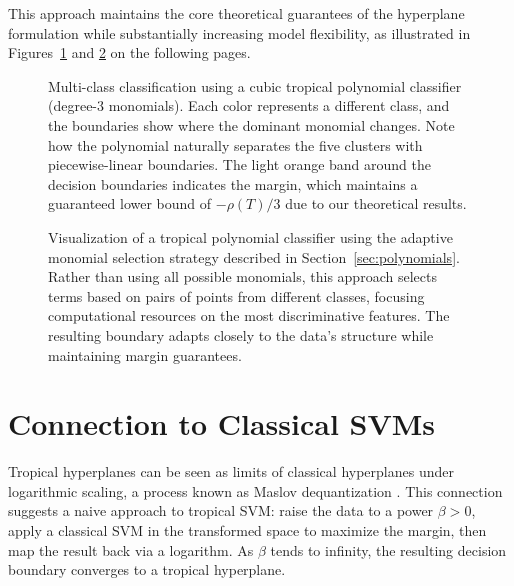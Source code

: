 \documentclass{article}
\begin{document}
This approach maintains the core theoretical guarantees of the hyperplane formulation while substantially increasing model flexibility, as illustrated in Figures~\ref{fig:homogeneous_selection} and \ref{fig:adaptive_polynomial} on the following pages.

\newpage

\vspace*{2em}
\begin{figure}[ht!]
    \centering
    \resizebox{0.9\textwidth}{!}{\clipbox{0.15\width{} 0.30\height{} 0.15\width{} 0.30\height{}}{}}
    \caption{Multi-class classification using a cubic tropical polynomial classifier (degree-3 monomials). Each color represents a different class, and the boundaries show where the dominant monomial changes. Note how the polynomial naturally separates the five clusters with piecewise-linear boundaries. The light orange band around the decision boundaries indicates the margin, which maintains a guaranteed lower bound of $-\rho(T)/3$ due to our theoretical results.}
    \label{fig:homogeneous_selection}
\end{figure}
\vspace*{4em}
\begin{figure}[ht!]
    \centering
    \resizebox{0.9\textwidth}{!}{\clipbox{0.15\width{} 0.30\height{} 0.15\width{} 0.30\height{}}{}}
    \caption{Visualization of a tropical polynomial classifier using the adaptive monomial selection strategy described in Section~\ref{sec:polynomials}. Rather than using all possible monomials, this approach selects terms based on pairs of points from different classes, focusing computational resources on the most discriminative features. The resulting boundary adapts closely to the data's structure while maintaining margin guarantees.}
    \label{fig:adaptive_polynomial}
\end{figure}
\vspace*{2em}


\newpage
\section{Connection to Classical SVMs}\label{sec:maslov}
Tropical hyperplanes can be seen as limits of classical hyperplanes under logarithmic scaling, a process known as Maslov dequantization \cite{viro2001}. This connection suggests a naive approach to tropical SVM: raise the data to a power $\beta > 0$, apply a classical SVM in the transformed space to maximize the margin, then map the result back via a logarithm. As $\beta$ tends to infinity, the resulting decision boundary converges to a tropical hyperplane.
\end{document}
